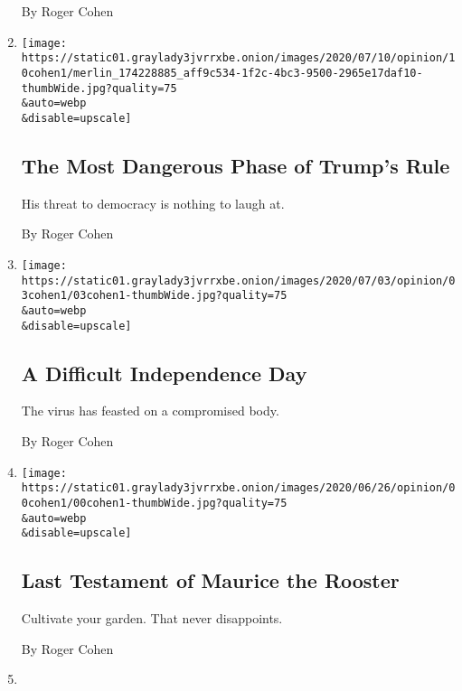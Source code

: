 \begin{enumerate}
  By Roger Cohen
\item
  \href{/2020/07/10/opinion/trump-nationalism.html}{}

  \texttt{[image: https://static01.graylady3jvrrxbe.onion/images/2020/07/10/opinion/10cohen1/merlin\_174228885\_aff9c534-1f2c-4bc3-9500-2965e17daf10-thumbWide.jpg?quality=75\\\&auto=webp\\\&disable=upscale]}

  \hypertarget{the-most-dangerous-phase-of-trumps-rule}{%
  \subsection{The Most Dangerous Phase of Trump's
  Rule}\label{the-most-dangerous-phase-of-trumps-rule}}

  His threat to democracy is nothing to laugh at.

  By Roger Cohen
\item
  \href{/2020/07/02/opinion/july-4th-coronavirus.html}{}

  \texttt{[image: https://static01.graylady3jvrrxbe.onion/images/2020/07/03/opinion/03cohen1/03cohen1-thumbWide.jpg?quality=75\\\&auto=webp\\\&disable=upscale]}

  \hypertarget{a-difficult-independence-day}{%
  \subsection{A Difficult Independence
  Day}\label{a-difficult-independence-day}}

  The virus has feasted on a compromised body.

  By Roger Cohen
\item
  \href{/2020/06/26/opinion/maurice-rooster-france.html}{}

  \texttt{[image: https://static01.graylady3jvrrxbe.onion/images/2020/06/26/opinion/00cohen1/00cohen1-thumbWide.jpg?quality=75\\\&auto=webp\\\&disable=upscale]}

  \hypertarget{last-testament-of-maurice-the-rooster}{%
  \subsection{Last Testament of Maurice the
  Rooster}\label{last-testament-of-maurice-the-rooster}}

  Cultivate your garden. That never disappoints.

  By Roger Cohen
\item
  \href{/2020/06/26/opinion/let-freedom-ring-from-georgia.html}{}


\end{enumerate}
